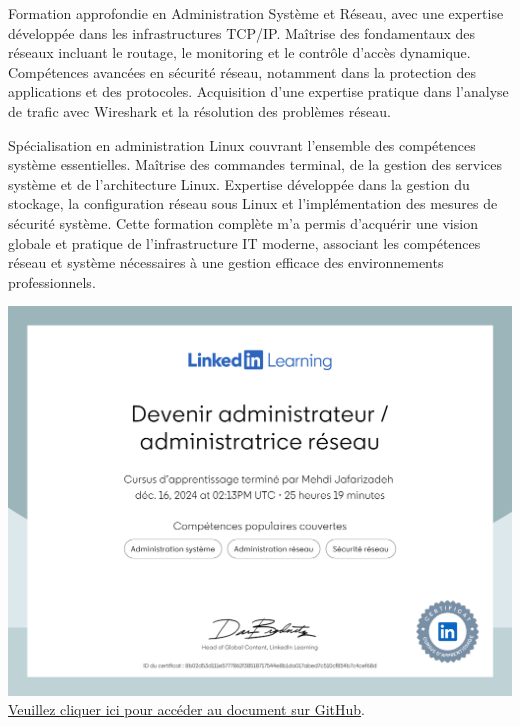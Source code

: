 \documentclass{article}
\begin{document}
    Formation approfondie en Administration Système et Réseau, avec une expertise développée dans les infrastructures TCP/IP. Maîtrise des fondamentaux des réseaux incluant le routage, le monitoring et le contrôle d'accès dynamique. Compétences avancées en sécurité réseau, notamment dans la protection des applications et des protocoles. Acquisition d'une expertise pratique dans l'analyse de trafic avec Wireshark et la résolution des problèmes réseau.

    Spécialisation en administration Linux couvrant l'ensemble des compétences système essentielles. Maîtrise des commandes terminal, de la gestion des services système et de l'architecture Linux. Expertise développée dans la gestion du stockage, la configuration réseau sous Linux et l'implémentation des mesures de sécurité système. Cette formation complète m'a permis d'acquérir une vision globale et pratique de l'infrastructure IT moderne, associant les compétences réseau et système nécessaires à une gestion efficace des environnements professionnels.
    \newline
    
    
    \begin{center}
        \includegraphics[width=\textwidth,height=\textheight,keepaspectratio]{../Document/Certificats de Fin de Cours/Devenir administrateur administratrice reseau/Devenir administrateur administratrice reseau.pdf}
        \footnotesize
         \href{https://github.com/jafarizadeh/CV---lettre/tree/00df58c41988ba7488536512caee235bdb5d570d/Document/Certificats%20de%20Fin%20de%20Cours/Devenir%20administrateur%20%20administratrice%20reseau}{Veuillez cliquer ici pour accéder au document sur GitHub}.

         
    \end{center}
\end{document}
